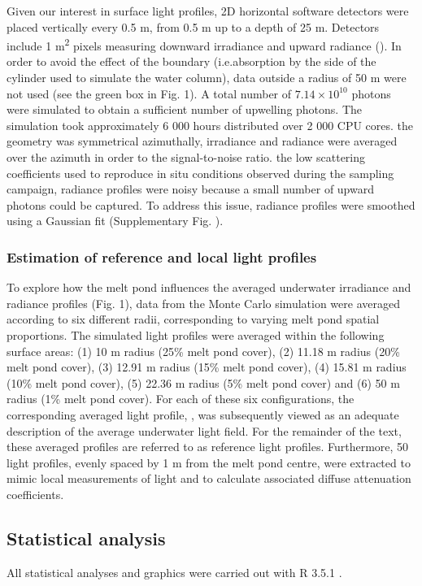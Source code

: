 Given our interest in surface light profiles, 2D horizontal software detectors were placed vertically every 0.5 m, from 0.5 m up to a depth of 25 m. Detectors include 1 m\textsuperscript{2} pixels measuring downward irradiance and upward radiance (\DIFdelbegin {}\DIFdelend \DIFaddbegin {}\DIFaddend ). In order to avoid the effect of the boundary (i.e.\DIFaddbegin \DIFadd{, }\DIFaddend absorption by the side of the cylinder used to simulate the water column), data outside a radius of 50 m were not used (see the green box in Fig. 1). A total number of $7.14 \times 10^{10}$ photons were simulated to obtain a sufficient number of upwelling photons. The simulation took approximately 6 000 hours distributed over 2 000 CPU cores. \DIFdelbegin {}\DIFdelend \DIFaddbegin {}\DIFaddend the geometry was symmetrical azimuthally, irradiance and radiance were averaged over the azimuth in order to \DIFdelbegin {}\DIFdelend \DIFaddbegin {}\DIFaddend the signal-to-noise ratio. \DIFdelbegin {}\DIFdelend \DIFaddbegin {}\DIFaddend the low scattering coefficients used to reproduce in situ conditions observed during the sampling campaign, radiance profiles were noisy because a small number of upward photons could be captured. To address this issue, radiance profiles were smoothed using a Gaussian fit (Supplementary Fig. \DIFdelbegin {}\DIFdelend \DIFaddbegin {}\DIFaddend ). 

\subsubsection{Estimation of reference and local light profiles}

To explore how the melt pond influences the averaged underwater irradiance and radiance profiles (Fig. 1), data from the Monte Carlo simulation were averaged according to six different radii, corresponding to varying melt pond spatial proportions. The simulated light profiles were averaged within the following surface areas: (1) 10 m radius (25\% melt pond cover), (2) 11.18 m radius (20\% melt pond cover), (3) 12.91 m radius (15\% melt pond cover), (4) 15.81 m radius (10\% melt pond cover), (5) 22.36 m radius (5\% melt pond cover) and (6) 50 m radius (1\% melt pond cover). For each of these six configurations, the corresponding averaged light profile, \meanedz{}, was subsequently viewed as an adequate description of the average underwater light field. For the remainder of the text, these averaged profiles are referred to as reference light profiles. Furthermore, 50 light profiles, evenly spaced by 1 m from the melt pond centre, were extracted to mimic local measurements of light and to calculate associated diffuse attenuation coefficients.

\subsection{Statistical analysis}

All statistical analyses and graphics were carried out with R 3.5.1 \citep{RCoreTeam2018}. 